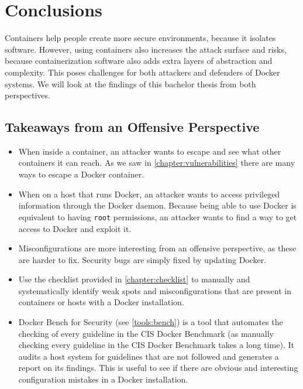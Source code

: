 \chapter{Conclusions}\label{chapter:conclusions}
\todo[inline]{}
Containers help people create more secure environments, because it isolates software. However, using containers also increases the attack surface and risks, because containerization software also adds extra layers of abstraction and complexity. This poses challenges for both attackers and defenders of Docker systems. We will look at the findings of this bachelor thesis from both perspectives.

\section{Takeaways from an Offensive Perspective}

\begin{itemize}
    \item When inside a container, an attacker wants to escape and see what other containers it can reach. As we saw in \autoref{chapter:vulnerabilities} there are many ways to escape a Docker container.

    \item When on a host that runs Docker, an attacker wants to access privileged information through the Docker daemon. Because being able to use Docker is equivalent to having \lstinline{root} permissions, an attacker wants to find a way to get access to Docker and exploit it.

    \item Misconfigurations are more interesting from an offensive perspective, as these are harder to fix. Security bugs are simply fixed by updating Docker.

    \item Use the checklist provided in \autoref{chapter:checklist} to manually and systematically identify weak spots and misconfigurations that are present in containers or hosts with a Docker installation.

    \item Docker Bench for Security (see \autoref{tools:bench}) is a tool that automates the checking of every guideline in the CIS Docker Benchmark (as manually checking every guideline in the CIS Docker Benchmark takes a long time). It audits a host system for guidelines that are not followed and generates a report on its findings. This is useful to see if there are obvious and interesting configuration mistakes in a Docker installation.

\end{itemize}

